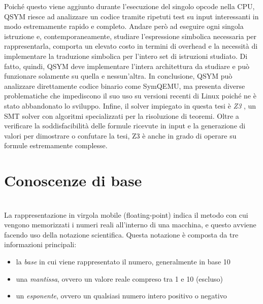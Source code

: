 \documentclass[Lau, oneside]{sapthesis}%
\begin{document}
\newline
Poiché questo viene aggiunto durante l'esecuzione del singolo opcode nella CPU, QSYM riesce ad analizzare un codice tramite ripetuti test su input interessanti in modo estremamente rapido e completo.
\newline
Andare però ad eseguire ogni singola istruzione e, contemporaneamente, studiare l'espressione simbolica necessaria per rappresentarla, comporta un elevato costo in termini di overhead e la necessità di implementare la traduzione simbolica per l'intero set di istruzioni studiato.
\newline
Di fatto, quindi, QSYM deve implementare l'intera architettura da studiare e può funzionare solamente su quella e nessun'altra.
\newline
In conclusione, QSYM può analizzare direttamente codice binario come SymQEMU, ma presenta diverse problematiche che impediscono il suo uso su versioni recenti di Linux poiché ne è stato abbandonato lo sviluppo.
\newline \newline \newline
Infine, il solver impiegato in questa tesi è \textit{Z3} \cite{ref:z3}, un SMT solver con algoritmi specializzati per la risoluzione di teoremi.
\newline
Oltre a verificare la soddisfacibilità delle formule ricevute in input e la generazione di valori per dimostrare o confutare la tesi, Z3 è anche in grado di operare su formule estremamente complesse.
\newline









\chapter{Conoscenze di base}
\ \\
La rappresentazione in virgola mobile (floating-point) indica il metodo con cui vengono memorizzati i numeri reali all'interno di una macchina, e questo avviene facendo uso della notazione scientifica.
\newline
Questa notazione è composta da tre informazioni principali:
\begin{itemize}
    \item la \textit{base} in cui viene rappresentato il numero, generalmente in base 10
    \item una \textit{mantissa}, ovvero un valore reale compreso tra 1 e 10 (escluso)
    \item un \textit{esponente}, ovvero un qualsiasi numero intero positivo o negativo
\end{itemize}
\end{document}
